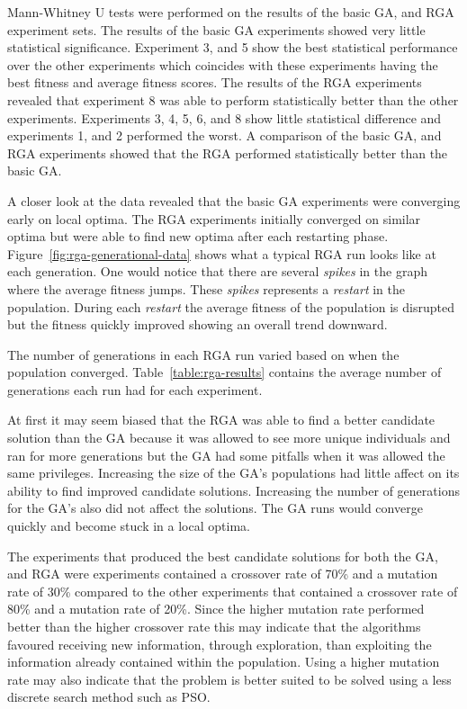 Mann-Whitney U tests were performed on the results of the basic GA, and RGA experiment sets. The results of the basic GA experiments showed very little statistical significance. Experiment 3, and 5 show the best statistical performance over the other experiments which coincides with these experiments having the best fitness and average fitness scores. The results of the RGA experiments revealed that experiment 8 was able to perform statistically better than the other experiments. Experiments 3, 4, 5, 6, and 8 show little statistical difference and experiments 1, and 2 performed the worst. A comparison of the basic GA, and RGA experiments showed that the RGA performed statistically better than the basic GA.

A closer look at the data revealed that the basic GA experiments were converging early on local optima. The RGA experiments initially converged on similar optima but were able to find new optima after each restarting phase. Figure~\ref{fig:rga-generational-data} shows what a typical RGA run looks like at each generation. One would notice that there are several \textit{spikes} in the graph where the average fitness jumps. These \textit{spikes} represents a \textit{restart} in the population. During each \textit{restart} the average fitness of the population is disrupted but the fitness quickly improved showing an overall trend downward.

The number of generations in each RGA run varied based on when the population converged. Table~\ref{table:rga-results} contains the average number of generations each run had for each experiment.

At first it may seem biased that the RGA was able to find a better candidate solution than the GA because it was allowed to see more unique individuals and ran for more generations but the GA had some pitfalls when it was allowed the same privileges. Increasing the size of the GA's populations had little affect on its ability to find improved candidate solutions. Increasing the number of generations for the GA's also did not affect the solutions. The GA runs would converge quickly and become stuck in a local optima.

The experiments that produced the best candidate solutions for both the GA, and RGA were experiments contained a crossover rate of 70\% and a mutation rate of 30\% compared to the other experiments that contained a crossover rate of 80\% and a mutation rate of 20\%. Since the higher mutation rate performed better than the higher crossover rate this may indicate that the algorithms favoured receiving new information, through exploration, than exploiting the information already contained within the population. Using a higher mutation rate may also indicate that the problem is better suited to be solved using a less discrete search method such as PSO.

